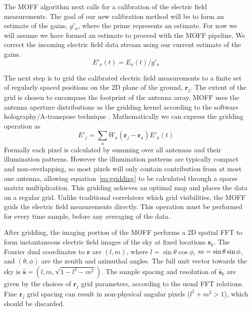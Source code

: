 \documentclass[a4paper,fleqn,usenatbib]{mnras}
\newcommand{\s}{\ensuremath{\hat{\mathbf{s}}}} %
\begin{document}
The MOFF algorithm next calls for a calibration of the electric field measurements. The goal of our new calibration method will be 
to form an estimate of the gains, $g'_a$, where the prime represents an estimate. For now we will assume we have formed an estimate 
to proceed with the MOFF pipeline. We correct the incoming electric field data stream using our 
current estimate of the gains.
\begin{equation}
E'_a(t) = E_a(t)/ g'_a
\end{equation}

The next step is to grid the calibrated electric field measurements to a finite set of regularly spaced 
positions on the 2D plane of the ground, $\mathbf{r}_j$.
The extent of the grid is chosen to encompass the footprint of the antenna array.
MOFF uses the antenna aperture distributions as the gridding 
kernel according to the software holography/A-transpose technique \citep{mor09,bha08}. 
Mathematically we can express the gridding operation as
\begin{equation}\label{eq:gridding}
E'_j=\sum_a W_a(\mathbf{r}_j-\mathbf{r}_a) E'_a(t)
\end{equation}
Formally each pixel is calculated by summing over all antennas and their illumination patterns.
However the illumination patterns are typically compact and non-overlapping, so most pixels
will only contain contribution from at most one antenna, allowing equation~\ref{eq:gridding}
to be calculated through a sparse matrix multiplication.
This gridding 
achieves an optimal map \citep{teg97b} and places the data on a regular grid. Unlike 
traditional correlators which grid visibilities, the MOFF grids the electric field measurements directly. This 
operation must be performed for every time sample, before any averaging of the data.

After gridding, the imaging portion of the MOFF performs a 2D spatial FFT to form 
instantaneous electric field images of the sky at fixed locations $\s_k$.
The Fourier dual coordinates to $\mathbf{r}$ are $(l,m)$, where $l=\sin\theta\cos\phi$,
$m=\nobreak\sin\theta\sin\phi$, and $(\theta,\phi)$ are the zenith 
and azimuthal angles. The full unit vector towards the sky is 
$\s=(l,m,\sqrt{1-l^2-m^2})$.
The sample spacing and resolution of $\s_k$ are given 
by the choices of $\mathbf{r}_j$ grid parameters, according to the usual FFT relations. 
Fine $\mathbf{r}_j$ grid spacing can result in non-physical angular pixels ($l^2+m^2>1$),
which should be discarded.
\end{document}
